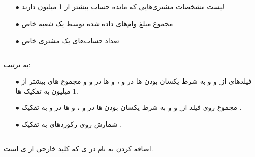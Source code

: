 \documentclass{article}
\begin{document}
\subsection{}
\begin{itemize}
    \item [$\bullet$] لیست مشخصات مشتری‌هایی که مانده حساب بیشتر از 1 میلیون دارند
    \item [$\bullet$] مجموع مبلغ وام‌های داده شده توسط یک شعبه خاص
    \item [$\bullet$] تعداد حساب‌های یک مشتری خاص
\end{itemize}
\subsection{}
به ترتیب:
\begin{itemize}
    \item [$\bullet$] فیلدهای  از ِ  و  و  به شرط یکسان بودن ها در  و ، و ها در  و  و مجموع های بیشتر از 1 میلیون به تفکیک ها.
    \item [$\bullet$] مجموع روی فیلد  از ِ  و  و  به شرط یکسان بودن ها در  و ، و ها در  و  به تفکیک .
    \item [$\bullet$] شمارش روی رکوردهای  به تفکیک .
\end{itemize}
\subsection{}
اضافه کردن  به نام  در ی  که کلید خارجی از ی  است.

\section{}
\end{document}
